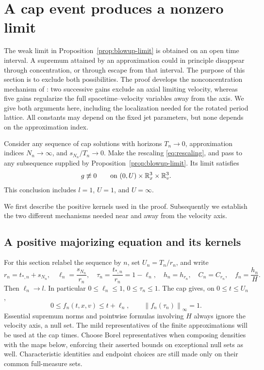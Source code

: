\section{A cap event produces a nonzero limit}
\label{sec:nonconcentration}
\label{nc:section}

The weak limit in Proposition~\ref{prop:blowup-limit} is obtained on an
open time interval.  A supremum attained by an approximation could in
principle disappear through concentration, or through escape from that
interval.  The purpose of this section is to exclude both possibilities.
The proof develops the nonconcentration mechanism of
\cite[Section~8]{OpenAIPeriodic}: two successive gains exclude an
axial limiting velocity, whereas five gains regularize the full
spacetime--velocity variables away from the axis. We give both
arguments here, including the localization needed for the rotated
period lattice. All constants may depend on the fixed jet parameters,
but none depends on the approximation index.

\begin{proposition}
\label{prop:nonzero-limit}
Consider any sequence of cap solutions with horizons \(T_n\to0\),
approximation indices \(N_n\to\infty\), and
\(s_{N_n}/T_n\to0\).  Make the rescaling
\eqref{eq:rescaling}, and pass to any subsequence supplied by
Proposition~\ref{prop:blowup-limit}.  Its limit satisfies
\[
 g\not\equiv0\qquad\text{on }(0,U)\times\mathbb R^3_x\times\mathbb R^3_v.
\]
This conclusion includes \(l=1\), \(U=1\), and \(U=\infty\).
\end{proposition}

We first describe the positive kernels used in the proof.  Subsequently
we establish the two different mechanisms needed near and away from the
velocity axis.

\subsection{A positive majorizing equation and its kernels}

For this section relabel the sequence by \(n\), set \(U_n=T_n/r_n\),
and write
\[
 r_n=t_{*,n}+s_{N_n},\quad
 \ell_n=\frac{s_{N_n}}{r_n},\quad
 \tau_n=\frac{t_{*,n}}{r_n}=1-\ell_n,\quad
 h_n=h_{r_n},\quad C_n=C_{r_n},\quad f_n=\frac{h_n}{H}.
\]
Then \(\ell_n\to l\). In particular \(0\le\ell_n\le1\),
\(0\le\tau_n\le1\). The cap gives, on \(0\le t\le U_n\),
\begin{equation}
\label{nc:cap-normalized}
 0\le f_n(t,x,v)\le t+\ell_n,\qquad
 \left\|f_n(\tau_n)\right\|_\infty=1.
\end{equation}
Essential supremum norms and pointwise formulas involving \(H\) always
ignore the velocity axis, a null set.  The mild representatives of the
finite approximations will be used at the cap times.
Choose Borel representatives when composing densities with the maps
below, enforcing their asserted bounds on exceptional null sets as
well.  Characteristic identities and endpoint choices are still made
only on their common full-measure sets.

